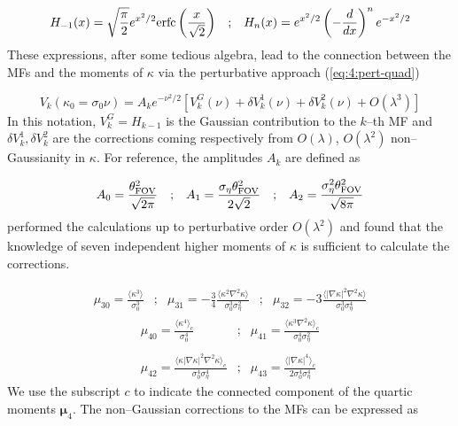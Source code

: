 \begin{equation}
\label{eq:4:hermite}
\begin{matrix}
\displaystyle H_{-1}(x) = \sqrt{\frac{\pi}{2}}e^{x^2/2}{\rm erfc}\left(\frac{x}{\sqrt{2}}\right) & ; & \displaystyle H_n(x) = e^{x^2/2}\left(-\frac{d}{dx}\right)^n e^{-x^2/2}
\end{matrix}
\end{equation}
%
These expressions, after some tedious algebra, lead to the connection between the MFs and the moments of $\kappa$ via the perturbative approach (\ref{eq:4:pert-quad})

\begin{equation}
\label{eq:4:Vk-pert}
V_k(\kappa_0=\sigma_0\nu) = A_k e^{-\nu^2/2}\left[V_k^G(\nu)+\delta V^1_k(\nu) + \delta V^2_k(\nu) + O(\lambda^3)\right] 
\end{equation}
%
In this notation, $V_k^G=H_{k-1}$ is the Gaussian contribution to the $k$--th MF and $\delta V^1_k,\delta V^2_k$ are the corrections coming respectively from $O(\lambda)$, $O(\lambda^2)$ non--Gaussianity in $\kappa$. For reference, the amplitudes $A_k$ are defined as 

\begin{equation}
\label{eq:4:amplitude}
\begin{matrix}
\displaystyle A_0 = \frac{\theta_{\rm FOV}^2}{\sqrt{2\pi}} & ; & \displaystyle A_1 = \frac{\sigma_\eta\theta_{\rm FOV}^2}{2\sqrt{2}} & ; & \displaystyle A_2 = \frac{\sigma_\eta^2\theta^2_{\rm FOV}}{\sqrt{8\pi}}
\end{matrix}
\end{equation}
%
\citep{Munshi12} performed the calculations up to perturbative order $O(\lambda^2)$ and found that the knowledge of seven independent higher moments of $\kappa$ is sufficient to calculate the corrections. 

\begin{equation}
\label{eq:4:skew-dimensionless}
\begin{matrix}
\displaystyle \mu_{30} = \frac{\langle\kappa^3\rangle}{\sigma_0^3} & ; & \displaystyle \mu_{31} = -\frac{3}{4} \frac{\langle\kappa^2\nabla^2\kappa\rangle}{\sigma_0^3\sigma_\eta^2} & ; & \displaystyle \mu_{32} = -3 \frac{\langle\vert\nabla\kappa\vert^2\nabla^2\kappa\rangle}{\sigma_0^3\sigma_\eta^4}
\end{matrix}
\end{equation}
%
\begin{equation}
\label{eq:4:kurt-dimensionless}
\begin{matrix}
\displaystyle \mu_{40} = \frac{\langle\kappa^4\rangle_c}{\sigma_0^4} & ; & \displaystyle \mu_{41} = \frac{\langle\kappa^3\nabla^2\kappa\rangle_c}{\sigma_0^4\sigma_\eta^2} \\ \\ 
\displaystyle \mu_{42} = \frac{\langle\kappa\vert\nabla\kappa\vert^2\nabla^2\kappa\rangle_c}{\sigma_0^4\sigma_\eta^4} & ; & \displaystyle \mu_{43} = \frac{\langle\vert\nabla\kappa\vert^4\rangle_c}{2\sigma_0^4\sigma_\eta^4}
\end{matrix}
\end{equation}
%
We use the subscript $c$ to indicate the connected component of the quartic moments $\pmb{\mu}_4$. The non--Gaussian corrections to the MFs can be expressed as 


